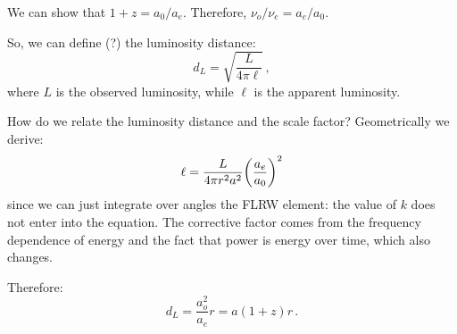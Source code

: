 \documentclass[main.tex]{subfiles}
\begin{document}
We can show that \(1+z = a_0/ a_e\). Therefore, \(\nu_o / \nu_e = a_e / a_0\).

So, we can define (?) the luminosity distance:
%
\begin{equation}
  d_L = \sqrt{\frac{L}{4 \pi \ell} } \,,
\end{equation}
%
where \(L\) is the observed luminosity, while \(\ell\) is the apparent luminosity.

How do we relate the luminosity distance and the scale factor? Geometrically we derive:
%
\begin{equation}
  \ell = \frac{L}{4 \pi r^2 a^2} \qty(\frac{a_e}{a_0}) ^2
\end{equation}
%
since we can just integrate over angles the FLRW element: the value of \(k\) does not enter into the equation.
The corrective factor comes from the frequency dependence of energy and the fact that power is energy over time, which also changes.

Therefore:
%
\begin{equation}
  d_L = \frac{a_o^2}{a_e} r = a (1+z) r\,.
\end{equation}
\end{document}
